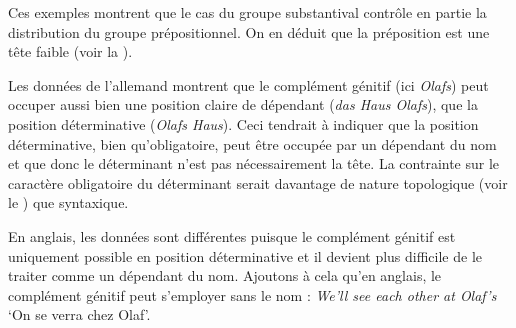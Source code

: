 {     Ces exemples montrent que le cas du groupe substantival contrôle en partie la distribution du groupe prépositionnel. On en déduit que la préposition est une tête faible (voir la ).

     Les données de l’allemand montrent que le complément génitif (ici \textit{Olafs}) peut occuper aussi bien une position claire de dépendant (\textit{das Haus Olafs}), que la position déterminative (\textit{Olafs Haus}). Ceci tendrait à indiquer que la position déterminative, bien qu’obligatoire, peut être occupée par un dépendant du nom et que donc le déterminant n’est pas nécessairement la tête. La contrainte sur le caractère obligatoire du déterminant serait davantage de nature topologique (voir le ) que syntaxique.

    En anglais, les données sont différentes puisque le complément génitif est uniquement possible en position déterminative et il devient plus difficile de le traiter comme un dépendant du nom. Ajoutons à cela qu’en anglais, le complément génitif peut s’employer sans le nom : \textit{We’ll see each other at Olaf’s} ‘On se verra chez Olaf’.
}
